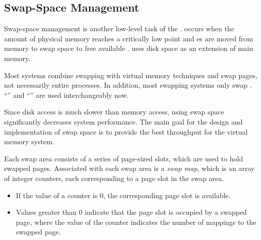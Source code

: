 \subsection{Swap-Space Management}\label{subsec:Swap_Space_Management}
Swap-space management is another low-level task of the .
 occurs when the amount of physical memory reaches a critically low point and es are moved from memory to swap space to free available .
 uses disk space as an extension of main memory.

Most systems combine swapping with virtual memory techniques and swap pages, not necessarily entire processes.
In addition, most swapping systems only swap .
``'' and ``'' are used interchangeably now.

Since disk access is much slower than memory access, using swap space significantly decreases system performance.
The main goal for the design and implementation of swap space is to provide the best throughput for the virtual memory system.

Each swap area consists of a series of page-sized slots, which are used to hold swapped pages.
Associated with each swap area is a \emph{swap map}, which is an array of integer counters, each corresponding to a page slot in the swap area.
\begin{itemize}[noitemsep]
\item If the value of a counter is 0, the corresponding page slot is available.
\item Values greater than 0 indicate that the page slot is occupied by a swapped page, where the value of the counter indicates the number of mappings to the swapped page.
\end{itemize}



